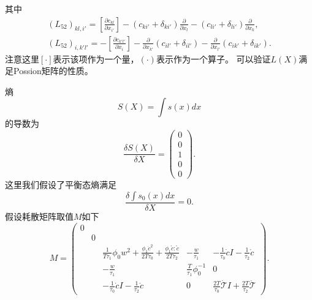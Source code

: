 	其中
	\begin{eqnarray*}
		(L_{52})_{kl,i'} = [\frac{\partial {c_{kl}}}{\partial x_{i'}}] - (c_{ki'} + \delta_{ki'}) \frac{\partial}{\partial x_l} - ( c_{li'} + \delta_{li'}) \frac{\partial}{\partial x_{k}}, \\
		(L_{52})_{i,k'l'} = -[\frac{\partial {c_{k'l'}}}{\partial x_{i}}] - \frac{\partial}{\partial x_{k'}} (c_{il'} + \delta_{il'})  - \frac{\partial}{\partial x_{l'}} ( c_{ik'} + \delta_{ik'}).
	\end{eqnarray*}
	注意这里$[\cdot]$表示该项作为一个量，$(\cdot)$表示作为一个算子。
	可以验证$L(X)$满足Possion矩阵的性质。

	熵
	\begin{equation}
		S(X) = \int s(x) dx
	\end{equation}
	的导数为
	\begin{equation*}
		\frac{\delta S(X)}{ \delta X} = \left( \begin{array}{c} 0 \\ 0 \\ 1 \\  0 \\ 0 \end{array} \right).
	\end{equation*}
	这里我们假设了平衡态熵满足
	\begin{equation}
		\frac{\delta \int s_0(x) dx}{ \delta X} = 0. 
	\end{equation}
	假设耗散矩阵取值$M$如下
	\begin{equation*}
		M = \left( \begin{array}{ccccc} 
		0 & & & & \\
		& 0 & & &  \\
		& & \frac{1}{T \tau_1} \phi_0 w^2 + \frac{\phi_1 \dot{c}^2}{2 T \tau_0} + \frac{\phi_1 \mathring{c}:\mathring{c}}{2 T \tau_2} & -\frac{w}{\tau_1} & -\frac{1}{\tau_0} \dot{c} I - \frac{1}{\tau_2} \mathring{c} \\  
		& &  -\frac{w}{\tau_1} & \frac{T}{\tau_1} \phi_0^{-1} & 0  \\
	    & &  -\frac{1}{\tau_0} \dot{c} I - \frac{1}{\tau_2} \mathring{c} & 0 & \frac{2T}{\tau_0} \dot{\mathcal{T}} I  + \frac{2T}{\tau_2}  \mathring{\mathcal{T}}   
		\end{array} \right).
	\end{equation*}
